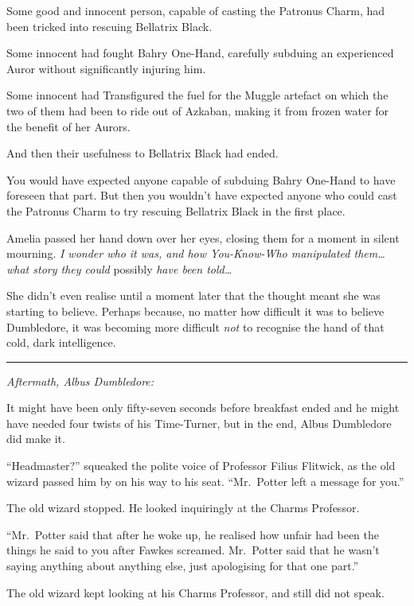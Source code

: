 Some good and innocent person, capable of casting the Patronus Charm,
had been tricked into rescuing Bellatrix Black.

Some innocent had fought Bahry One-Hand, carefully subduing an
experienced Auror without significantly injuring him.

Some innocent had Transfigured the fuel for the Muggle artefact on which
the two of them had been to ride out of Azkaban, making it from frozen
water for the benefit of her Aurors.

And then their usefulness to Bellatrix Black had ended.

You would have expected anyone capable of subduing Bahry One-Hand to
have foreseen that part. But then you wouldn't have expected anyone who
could cast the Patronus Charm to try rescuing Bellatrix Black in the
first place.

Amelia passed her hand down over her eyes, closing them for a moment in
silent mourning. \emph{I wonder who it was, and how You-Know-Who
manipulated them\ldots{} what story they could} possibly \emph{have been
told\ldots{}}

She didn't even realise until a moment later that the thought meant she
was starting to believe. Perhaps because, no matter how difficult it was
to believe Dumbledore, it was becoming more difficult \emph{not} to
recognise the hand of that cold, dark intelligence.

\begin{center}\rule{3in}{0.4pt}\end{center}

\emph{Aftermath, Albus Dumbledore:}

It might have been only fifty-seven seconds before breakfast ended and
he might have needed four twists of his Time-Turner, but in the end,
Albus Dumbledore did make it.

``Headmaster?'' squeaked the polite voice of Professor Filius Flitwick,
as the old wizard passed him by on his way to his seat. ``Mr.~Potter
left a message for you.''

The old wizard stopped. He looked inquiringly at the Charms Professor.

``Mr.~Potter said that after he woke up, he realised how unfair had been
the things he said to you after Fawkes screamed. Mr.~Potter said that he
wasn't saying anything about anything else, just apologising for that
one part.''

The old wizard kept looking at his Charms Professor, and still did not
speak.

